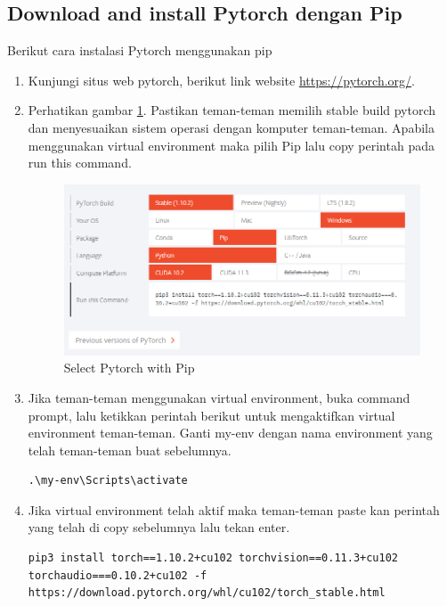 \subsection{Download and install Pytorch dengan Pip}
Berikut cara instalasi Pytorch menggunakan pip
\begin{enumerate}
\item Kunjungi situs web pytorch, berikut link website \small \url{https://pytorch.org/}.

\item Perhatikan gambar \ref{pytorch2}. Pastikan teman-teman memilih stable build pytorch dan menyesuaikan sistem operasi dengan komputer teman-teman. Apabila menggunakan virtual environment maka pilih Pip lalu copy perintah pada run this command.
\begin{figure}[H]
\centering
\includegraphics[scale=.45]{figures/pytorch2}
\caption{Select Pytorch with Pip}
\label{pytorch2}
\end{figure}

\item Jika teman-teman menggunakan virtual environment, buka command prompt, lalu ketikkan perintah berikut untuk mengaktifkan virtual environment teman-teman. Ganti my-env dengan nama environment yang telah teman-teman buat sebelumnya.
\begin{verbatim}
.\my-env\Scripts\activate
\end{verbatim}

\item Jika virtual environment telah aktif maka teman-teman paste kan perintah yang telah di copy sebelumnya lalu tekan enter.
\begin{lstlisting}
pip3 install torch==1.10.2+cu102 torchvision==0.11.3+cu102 torchaudio===0.10.2+cu102 -f https://download.pytorch.org/whl/cu102/torch_stable.html
\end{lstlisting}


\end{enumerate}

